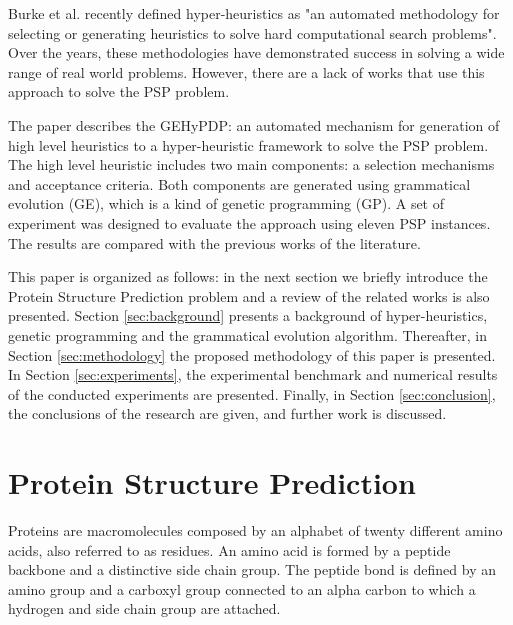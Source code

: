 \documentclass[conference]{IEEEtran}
\begin{document}
 Burke et al. \cite{burke2010classification} recently defined hyper-heuristics as "an automated methodology for selecting or generating heuristics to solve hard computational search problems". Over the years, these methodologies have demonstrated success in solving a wide range of real world problems.  However, there are a lack of works that use this approach to solve the PSP problem.

The paper describes the GEHyPDP: an automated  mechanism for generation of high level heuristics to a hyper-heuristic framework to solve the PSP problem. The high level heuristic includes two main components:  a selection mechanisms and acceptance criteria.  Both components are generated using grammatical evolution (GE), which is a kind of genetic programming (GP). A set of experiment was designed to evaluate the approach using eleven PSP instances. The results are compared with the previous works of the literature.  



This paper is organized as follows: in the next section we briefly introduce the Protein Structure Prediction problem and a review of the related works is also presented.  Section \ref{sec:background} presents a background of hyper-heuristics, genetic programming and the grammatical evolution algorithm. Thereafter, in Section \ref{sec:methodology} the proposed methodology of this paper is presented. In Section \ref{sec:experiments}, the experimental benchmark and numerical results of the conducted experiments are presented. Finally, in Section \ref{sec:conclusion}, the conclusions of the research are given, and further work is discussed.



\section{Protein Structure Prediction} \label{sec:proteinfolding}


Proteins are macromolecules composed by an alphabet of twenty different amino acids, also referred to as residues. An amino acid is formed by a peptide backbone and a distinctive side chain group. The peptide bond is defined by an amino group and a carboxyl group connected to an alpha carbon to which a hydrogen and side chain group are attached.
\end{document}
